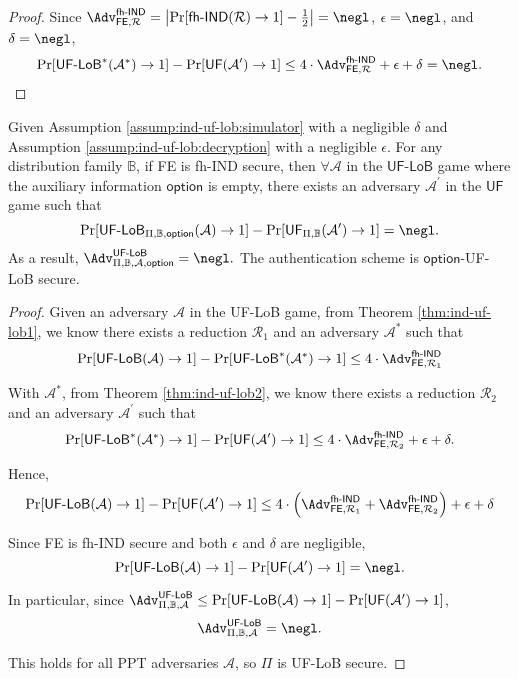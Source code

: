 \begin{proof}
\noindent Since $\Adv_{\textsf{FE}, \mathcal{R}}^\textsf{fh-IND} = \left| \Pr[\textsf{fh-IND}(\mathcal{R}) \to 1] - \frac{1}{2} \right| = \negl$, $\epsilon = \negl$, and $\delta = \negl$,
\[
	\Pr[\textsf{UF-LoB}^*(\mathcal{A}^*) \to 1] - \Pr[\textsf{UF}(\mathcal{A}^\prime) \to 1] \leq 4 \cdot \Adv_{\textsf{FE}, \mathcal{R}}^\textsf{fh-IND} + \epsilon + \delta = \negl.
\]

\end{proof}

\begin{corollary}
Given Assumption \ref{assump:ind-uf-lob:simulator} with a negligible $\delta$ and Assumption \ref{assump:ind-uf-lob:decryption} with a negligible $\epsilon$.
	For any distribution family $\mathbb{B}$, if \textsf{FE} is fh-IND secure, then $\forall \mathcal{A}$ in the $\textsf{UF-LoB}$ game where the auxiliary information $\textsf{option}$ is empty, there exists an adversary $\mathcal{A}^\prime$ in the $\textsf{UF}$ game such that
\[
	\Pr[\textsf{UF-LoB}_{\Pi, \mathbb{B}, \textsf{option}}(\mathcal{A}) \to 1] - \Pr[\textsf{UF}_{\Pi, \mathbb{B}}(\mathcal{A}^\prime) \to 1] = \negl.
\]
As a result, $\Adv_{\Pi, \mathbb{B}, \mathcal{A}, \textsf{option}}^{\textsf{UF-LoB}} = \negl.$ The authentication scheme is $\textsf{option}$-UF-LoB secure.	

\end{corollary}

\begin{proof}

Given an adversary $\mathcal{A}$ in the \textsf{UF-LoB} game, from Theorem \ref{thm:ind-uf-lob1}, we know there exists a reduction $\mathcal{R}_1$ and an adversary $\mathcal{A}^*$ such that
\[
	\Pr[\textsf{UF-LoB}(\mathcal{A}) \to 1] - \Pr[ \textsf{UF-LoB}^*(\mathcal{A}^*) \to 1 ] \leq 4 \cdot \Adv_{\textsf{FE}, \mathcal{R}_1}^\textsf{fh-IND}
\]

With $\mathcal{A}^*$, from Theorem \ref{thm:ind-uf-lob2}, we know there exists a reduction $\mathcal{R}_2$ and an adversary $\mathcal{A}^\prime$ such that 
\[
	\Pr[\textsf{UF-LoB}^*(\mathcal{A}^*) \to 1] - \Pr[\textsf{UF}(\mathcal{A}^\prime) \to 1] \leq 4 \cdot \Adv_{\textsf{FE}, \mathcal{R}_2}^\textsf{fh-IND} + \epsilon + \delta.
\]

Hence,
\[
	\Pr[\textsf{UF-LoB}(\mathcal{A}) \to 1] - \Pr[\textsf{UF}(\mathcal{A}^\prime) \to 1] \leq 4 \cdot \left( \Adv_{\textsf{FE}, \mathcal{R}_1}^\textsf{fh-IND} + \Adv_{\textsf{FE}, \mathcal{R}_2}^\textsf{fh-IND} \right) + \epsilon + \delta
\]

Since \textsf{FE} is \textsf{fh-IND} secure and both $\epsilon$ and $\delta$ are negligible,
\[
	\Pr[\textsf{UF-LoB}(\mathcal{A}) \to 1] - \Pr[\textsf{UF}(\mathcal{A}^\prime) \to 1] = \negl.
\]

\noindent In particular, since $\Adv_{\Pi, \mathbb{B}, \mathcal{A}}^{\textsf{UF-LoB}} \leq \Pr[\textsf{UF-LoB}(\mathcal{A}) \to 1] - \Pr[\textsf{UF}(\mathcal{A}^\prime) \to 1]$,
\[
	\Adv_{\Pi, \mathbb{B}, \mathcal{A}}^{\textsf{UF-LoB}} = \negl.
\]

\noindent This holds for all PPT adversaries $\mathcal{A}$, so $\Pi$ is UF-LoB secure.

\end{proof}
